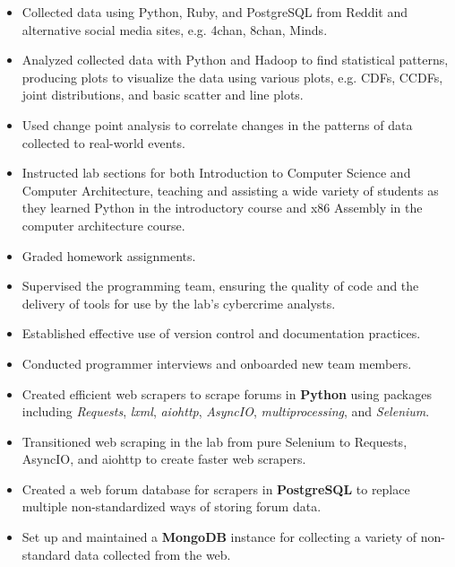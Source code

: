 \documentclass[10pt]{setzerresume}
\begin{document}
  \begin{itemize}[nosep]%
    \item Collected data using Python, Ruby, and PostgreSQL from Reddit and alternative social media sites, e.g. 4chan, 8chan, Minds.
    \item Analyzed collected data with Python and Hadoop to find statistical patterns, producing plots to visualize the data using various plots, e.g. CDFs, CCDFs, joint distributions, and basic scatter and line plots.
    \item Used change point analysis to correlate changes in the patterns of data collected to real-world events.
    \item Instructed lab sections for both Introduction to Computer Science and Computer Architecture, teaching and assisting a wide variety of students as they learned Python in the introductory course and x86 Assembly in the computer architecture course.
    \item Graded homework assignments.
  \end{itemize}



  \begin{itemize}[nosep]%

    \item Supervised the programming team, ensuring the quality of code and the delivery of tools for use by the lab's cybercrime analysts.
    \item Established effective use of version control and documentation practices.
    \item Conducted programmer interviews and onboarded new team members.
    \item Created efficient web scrapers to scrape forums in \textbf{Python} using packages including \textit{Requests}, \textit{lxml}, \textit{aiohttp}, \textit{AsyncIO}, \textit{multiprocessing}, and \textit{Selenium}.
    \item Transitioned web scraping in the lab from pure Selenium to Requests, AsyncIO, and aiohttp to create faster web scrapers.
    \item Created a web forum database for scrapers in \textbf{PostgreSQL} to replace multiple non-standardized ways of storing forum data.
    \item Set up and maintained a \textbf{MongoDB} instance for collecting a variety of non-standard data collected from the web.
          
  \end{itemize}
\end{document}

